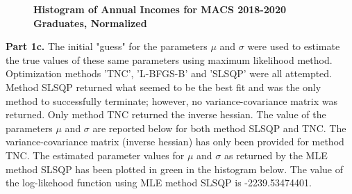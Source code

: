 \documentclass[letterpaper,12pt]{article}
\theoremstyle{definition}
\begin{document}
\begin{figure}[htb]\centering\captionsetup{width=4.0in}
  \caption{\textbf{Histogram of Annual Incomes for MACS 2018-2020 Graduates, Normalized}}\label{FigPS2_1b}
\end{figure}

\noindent\newline\textbf{Part 1c.} The initial "guess" for the parameters $\mu$ and $\sigma$ were used to estimate the true values of these same parameters using maximum likelihood method. Optimization methods 'TNC', 'L-BFGS-B' and 'SLSQP' were all attempted. Method SLSQP returned what seemed to be the best fit and was the only method to successfully terminate; however, no variance-covariance matrix was returned. Only method TNC returned the inverse hessian. The value of the parameters $\mu$ and $\sigma$  are reported below for both method SLSQP and TNC. The variance-covariance matrix (inverse hessian) has only been provided for method TNC. The estimated parameter values for $\mu$ and $\sigma$ as returned by the MLE method SLSQP has been plotted in green in the histogram below. The value of the log-likehood function using MLE method SLSQP is -2239.53474401.

\clearpage
\end{document}

